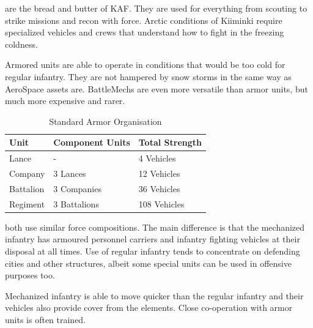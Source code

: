 \documentclass{tufte-book}
\begin{document}
 are the bread and butter of KAF. 
They are used for everything from scouting to strike missions and recon 
with force. Arctic conditions of Kiiminki require specialized vehicles 
and crews that understand how to fight in the freezing coldness.

Armored units are able to operate in conditions that would be too cold
for regular infantry. They are not hampered by snow storms in the same
way as AeroSpace assets are. BattleMechs are even more versatile than
armor units, but much more expensive and rarer.

\bigskip
\begin{table}
\begin{minipage}{\textwidth}
\begin{center}
\begin{tabular}{lll}
\toprule
Unit & Component Units & Total Strength \\
\midrule
Lance     & -            & 4 Vehicles \\
Company   & 3 Lances     & 12 Vehicles \\
Battalion & 3 Companies  & 36 Vehicles \\
Regiment  & 3 Battalions & 108 Vehicles \\
\bottomrule
\end{tabular}
\end{center}
\end{minipage}
\caption{Standard Armor Organisation}
\end{table}

 both use similar force
compositions. The main difference is that the mechanized infantry has
armoured personnel carriers and infantry fighting vehicles at their
disposal at all times. Use of regular infantry tends to concentrate on
defending cities and other structures, albeit some special units can be
used in offensive purposes too.

Mechanized infantry is able to move quicker than the regular infantry
and their vehicles also provide cover from the elements. Close
co-operation with armor units is often trained.
\end{document}
